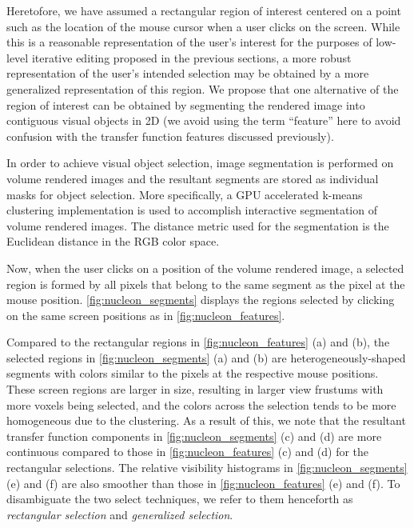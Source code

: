 \documentclass[twoside,twocolumn,10pt]{article}
\begin{document}

Heretofore, we have assumed a rectangular region of interest centered on a point such as the location of the mouse cursor when a user clicks on the screen. While this is a reasonable representation of the user's interest for the purposes of low-level iterative editing proposed in the previous sections, a more robust representation of the user's intended selection may be obtained by a more generalized representation of this region. We propose that one alternative of the region of interest can be obtained by segmenting the rendered image into contiguous visual objects in 2D (we avoid using the term ``feature'' here to avoid confusion with the transfer function features discussed previously).

In order to achieve visual object selection, image segmentation is performed on volume rendered images and the resultant segments are stored as individual masks for object selection. More specifically, a GPU accelerated k-means clustering implementation is used to accomplish interactive segmentation of volume rendered images. The distance metric used for the segmentation is the Euclidean distance in the RGB color space.

Now, when the user clicks on a position of the volume rendered image, a selected region is formed by all pixels that belong to the same segment as the pixel at the mouse position.
\autoref{fig:nucleon_segments} displays the regions selected by clicking on the same screen positions as in \autoref{fig:nucleon_features}.

Compared to the rectangular regions in \autoref{fig:nucleon_features} (a) and (b), the selected regions in \autoref{fig:nucleon_segments} (a) and (b) are heterogeneously-shaped segments with colors similar to the pixels at the respective mouse positions. These screen regions are larger in size, resulting in larger view frustums with more voxels being selected, and the colors across the selection tends to be more homogeneous due to the clustering. As a result of this, we note that the resultant transfer function components in \autoref{fig:nucleon_segments} (c) and (d) are more continuous compared to those in \autoref{fig:nucleon_features} (c) and (d) for the rectangular selections. The relative visibility histograms in \autoref{fig:nucleon_segments} (e) and (f) are also smoother than those in \autoref{fig:nucleon_features} (e) and (f). To disambiguate the two select techniques, we refer to them henceforth as \emph{rectangular selection} and \emph{generalized selection}.
\end{document}
